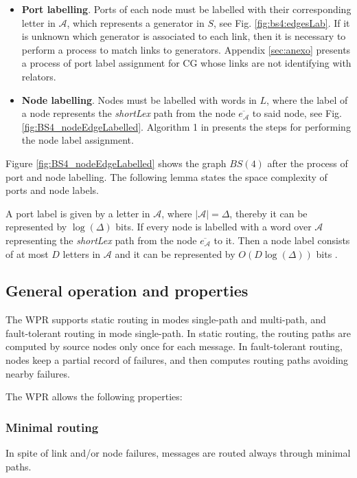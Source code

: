 \begin{itemize}
    \item \textbf{Port labelling}. Ports of each node must be labelled with their corresponding letter in $\mathcal{A}$, which represents a generator in $S$, see Fig. \ref{fig:bs4:edgesLab}. If it is unknown which generator is associated to each link, then it is necessary to perform a process to match links to generators. Appendix \ref{sec:anexo} presents a process of port label assignment for CG whose links are not identifying with relators.
    \item \textbf{Node labelling}. Nodes must be labelled with words in $L$, where the label of a node represents the \textit{shortLex} path from the node $\overline{e_\mathcal{A}}$ to said node, see Fig. \ref{fig:BS4_nodeEdgeLabelled}. Algorithm 1 in \cite{wmgr} presents the steps for performing the node label assignment. 
\end{itemize}

Figure \ref{fig:BS4_nodeEdgeLabelled} shows the graph $BS(4)$ after the process of port and node labelling. The following lemma states the space complexity of ports and node labels.

\begin{lemma}
\label{lem:lables}
A port label is given by a letter in $\mathcal{A}$, where $|\mathcal{A}|=\Delta$, thereby it can be represented by $\log(\Delta)$ bits.
If every node is labelled with a word over $\mathcal{A}$ representing the \textit{shortLex} path from the node $\overline{e_\mathcal{A}}$ to it. Then a node label consists of at most $D$ letters in $\mathcal{A}$ and it can be represented by $O(D\log (\Delta ))$ bits \cite[Theorem 4]{AGUIRREGUERRERO2019218}.
\end{lemma}

\subsection{General operation and properties}

The WPR supports static routing in modes single-path and multi-path, and fault-tolerant routing in mode single-path. In static routing, the routing paths are computed by source nodes only once for each message. In fault-tolerant routing, nodes keep a partial record of failures, and then computes routing paths avoiding nearby failures. 
 
The WPR allows the following properties: 

\subsubsection{Minimal routing} In spite of link and/or node failures, messages are routed always through minimal paths.

